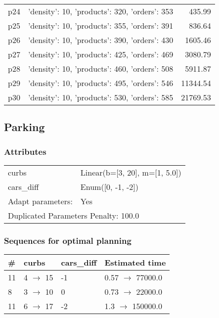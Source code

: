 \documentclass{article}
\begin{document}
\begin{center}
\begin{tabular}{@{}l|r|r@{}}
  p24&{'density': 10, 'products': 320, 'orders': 353}&435.99\\
  p25&{'density': 10, 'products': 355, 'orders': 391}&836.64\\
  p26&{'density': 10, 'products': 390, 'orders': 430}&1605.46\\
  p27&{'density': 10, 'products': 425, 'orders': 469}&3080.79\\
  p28&{'density': 10, 'products': 460, 'orders': 508}&5911.87\\
  p29&{'density': 10, 'products': 495, 'orders': 546}&11344.54\\
  p30&{'density': 10, 'products': 530, 'orders': 585}&21769.53
                            \end{tabular}
                            \end{center}
                    
                            \newpage \subsection{Parking}
                    \subsubsection*{Attributes}
                    \begin{tabular}{@{}p{}p{}@{}}
                    \toprule
                    curbs & Linear(b=[3, 20], m=[1, 5.0])\\
cars\_diff & Enum([0, -1, -2])
                    \\\midrule
                    Adapt parameters: & Yes \\
                    \bottomrule
                    \multicolumn{2}{l}{Duplicated Parameters Penalty: 100.0}
                    \end{tabular}
                
                            \subsubsection*{Sequences for optimal planning}

                            \begin{center}
                            \begin{tabular}{@{}l|l|l|l@{}}
                            \# & curbs & cars\_diff & Estimated time\\\midrule
                            11&4 $\rightarrow$ 15&-1&0.57 $\rightarrow$ 77000.0\\
8&3 $\rightarrow$ 10&0&0.73 $\rightarrow$ 22000.0\\
11&6 $\rightarrow$ 17&-2&1.3 $\rightarrow$ 150000.0
                            \end{tabular}
                            \end{center}
                    
\end{document}
